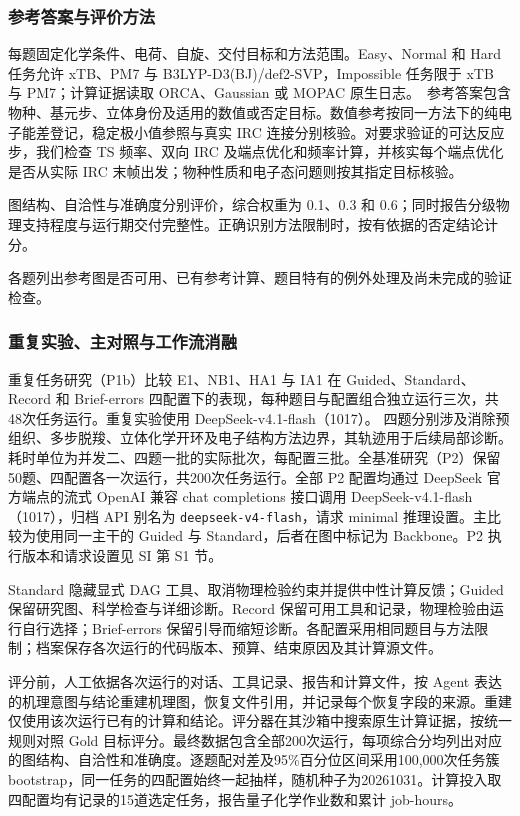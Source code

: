 \subsubsection{参考答案与评价方法}

每题固定化学条件、电荷、自旋、交付目标和方法范围。Easy、Normal 和 Hard 任务允许 xTB\citep{gfn2xtb2019}、PM7\citep{pm72013} 与 B3LYP-D3(BJ)/def2-SVP\citep{becke1993,lyp1988,stephens1994,d32010,d3bj2011,def22005}，Impossible 任务限于 xTB 与 PM7；计算证据读取 ORCA、Gaussian 或 MOPAC 原生日志。\citep{orca2025,gaussian16,mopac2026,ref11}\ 参考答案包含物种、基元步、立体身份及适用的数值或否定目标。数值参考按同一方法下的纯电子能差登记，稳定极小值参照与真实 IRC 连接分别核验。对要求验证的可达反应步，我们检查 TS 频率、双向 IRC 及端点优化和频率计算，并核实每个端点优化是否从实际 IRC 末帧出发；物种性质和电子态问题则按其指定目标核验。



图结构、自洽性与准确度分别评价，综合权重为 0.1、0.3 和 0.6；同时报告分级物理支持程度与运行期交付完整性。正确识别方法限制时，按有依据的否定结论计分。



各题列出参考图是否可用、已有参考计算、题目特有的例外处理及尚未完成的验证检查。

\subsubsection{重复实验、主对照与工作流消融}

重复任务研究（P1b）比较 E1、NB1、HA1 与 IA1 在 Guided、Standard、Record 和 Brief-errors 四配置下的表现，每种题目与配置组合独立运行三次，共48次任务运行。重复实验使用 DeepSeek-v4.1-flash（1017）。\citep{deepseekv42026} 四题分别涉及消除预组织、多步脱羧、立体化学开环及电子结构方法边界，其轨迹用于后续局部诊断。耗时单位为并发二、四题一批的实际批次，每配置三批。全基准研究（P2）保留50题、四配置各一次运行，共200次任务运行。全部 P2 配置均通过 DeepSeek 官方端点的流式 OpenAI 兼容 chat completions 接口调用 DeepSeek-v4.1-flash（1017），归档 API 别名为 \texttt{deepseek-v4-flash}，请求 minimal 推理设置。主比较为使用同一主干的 Guided 与 Standard，后者在图中标记为 Backbone。P2 执行版本和请求设置见 SI 第 S1 节。



Standard 隐藏显式 DAG 工具、取消物理检验约束并提供中性计算反馈；Guided 保留研究图、科学检查与详细诊断。Record 保留可用工具和记录，物理检验由运行自行选择；Brief-errors 保留引导而缩短诊断。各配置采用相同题目与方法限制；档案保存各次运行的代码版本、预算、结束原因及其计算源文件。



评分前，人工依据各次运行的对话、工具记录、报告和计算文件，按 Agent 表达的机理意图与结论重建机理图，恢复文件引用，并记录每个恢复字段的来源。重建仅使用该次运行已有的计算和结论。评分器在其沙箱中搜索原生计算证据，按统一规则对照 Gold 目标评分。最终数据包含全部200次运行，每项综合分均列出对应的图结构、自洽性和准确度。逐题配对差及95\%百分位区间采用100,000次任务簇 bootstrap，同一任务的四配置始终一起抽样，随机种子为20261031。计算投入取四配置均有记录的15道选定任务，报告量子化学作业数和累计 job-hours。

